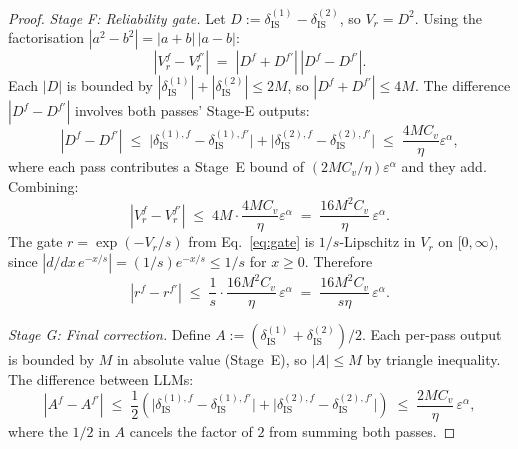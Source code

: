 \documentclass{article}
\begin{document}
\begin{proof}
\textit{Stage F: Reliability gate.} Let $D := \delta_{\text{IS}}^{(1)} - \delta_{\text{IS}}^{(2)}$, so $V_r = D^2$. Using the factorisation $|a^2 - b^2| = |a+b|\,|a-b|$:
\begin{equation*}
|V_r^f - V_r^{f'}| \;=\; |D^f + D^{f'}|\,|D^f - D^{f'}|.
\end{equation*}
Each $|D|$ is bounded by $|\delta_{\text{IS}}^{(1)}| + |\delta_{\text{IS}}^{(2)}| \leq 2M$, so $|D^f + D^{f'}| \leq 4M$. The difference $|D^f - D^{f'}|$ involves both passes' Stage-E outputs:
\begin{equation*}
|D^f - D^{f'}| \;\leq\; \big|\delta_{\text{IS}}^{(1),f} - \delta_{\text{IS}}^{(1),f'}\big| + \big|\delta_{\text{IS}}^{(2),f} - \delta_{\text{IS}}^{(2),f'}\big| \;\leq\; \frac{4 M C_v}{\eta}\varepsilon^\alpha,
\end{equation*}
where each pass contributes a Stage~E bound of $(2MC_v/\eta)\varepsilon^\alpha$ and they add. Combining:
\begin{equation*}
|V_r^f - V_r^{f'}| \;\leq\; 4M \cdot \frac{4M C_v}{\eta}\varepsilon^\alpha \;=\; \frac{16 M^2 C_v}{\eta}\,\varepsilon^\alpha.
\end{equation*}
The gate $r = \exp(-V_r/s)$ from Eq.~\ref{eq:gate} is $1/s$-Lipschitz in $V_r$ on $[0,\infty)$, since $|d/dx\,e^{-x/s}| = (1/s)e^{-x/s} \leq 1/s$ for $x \geq 0$. Therefore
\begin{equation*}
|r^f - r^{f'}| \;\leq\; \frac{1}{s} \cdot \frac{16 M^2 C_v}{\eta}\,\varepsilon^\alpha \;=\; \frac{16 M^2 C_v}{s\eta}\,\varepsilon^\alpha.
\end{equation*}

\textit{Stage G: Final correction.} Define $A := (\delta_{\text{IS}}^{(1)} + \delta_{\text{IS}}^{(2)})/2$. Each per-pass output is bounded by $M$ in absolute value (Stage~E), so $|A| \leq M$ by triangle inequality. The difference between LLMs:
\begin{equation*}
|A^f - A^{f'}| \;\leq\; \frac{1}{2}\!\left(\big|\delta_{\text{IS}}^{(1),f} - \delta_{\text{IS}}^{(1),f'}\big| + \big|\delta_{\text{IS}}^{(2),f} - \delta_{\text{IS}}^{(2),f'}\big|\right) \;\leq\; \frac{2 M C_v}{\eta}\,\varepsilon^\alpha,
\end{equation*}
where the $1/2$ in $A$ cancels the factor of $2$ from summing both passes.


\end{proof}
\end{document}
